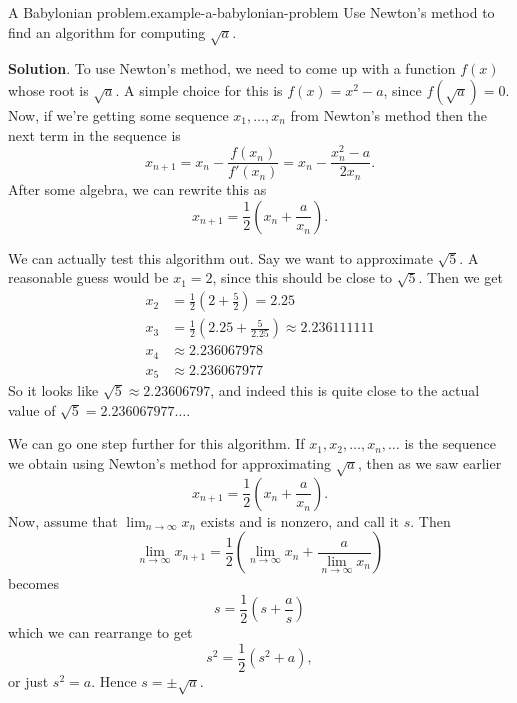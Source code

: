 \documentclass[10pt,]{book}
\numberwithin{equation}{section}
\begin{document}
\begin{example}{A Babylonian problem.}{example-a-babylonian-problem}%
\hypertarget{p-373}{}%
Use Newton's method to find an algorithm for computing \(\sqrt{a}\).%
\par\smallskip%
\noindent\textbf{Solution}.\hypertarget{solution-83}{}\quad%
\hypertarget{p-374}{}%
To use Newton's method, we need to come up with a function \(f(x)\) whose root is \(\sqrt{a}\). A simple choice for this is \(f(x) = x^{2} - a\), since \(f(\sqrt{a}) = 0\). Now, if we're getting some sequence \(x_{1},\ldots,x_{n}\) from Newton's method then the next term in the sequence is%
\begin{equation*}
x_{n+1} = x_{n} - \frac{f(x_{n})}{f'(x_{n})} = x_{n} - \frac{x_{n}^{2} - a}{2x_{n}}.
\end{equation*}
After some algebra, we can rewrite this as%
\begin{equation*}
x_{n+1} = \frac{1}{2}\left(x_{n} + \frac{a}{x_{n}}\right).
\end{equation*}
%
\par
\hypertarget{p-375}{}%
We can actually test this algorithm out. Say we want to approximate \(\sqrt{5}\). A reasonable guess would be \(x_{1} = 2\), since this should be close to \(\sqrt{5}\). Then we get%
\begin{align*}
x_{2} & = \frac{1}{2}\left(2 + \frac{5}{2}\right) = 2.25 \\
x_{3} & = \frac{1}{2}\left(2.25 + \frac{5}{2.25}\right) \approx 2.236111111 \\
x_{4} & \approx 2.236067978 \\
x_{5} & \approx 2.236067977 
\end{align*}
So it looks like \(\sqrt{5}\approx 2.23606797\), and indeed this is quite close to the actual value of \(\sqrt{5} = 2.236067977\ldots\).%
\par
\hypertarget{p-376}{}%
We can go one step further for this algorithm. If \(x_{1},x_{2},\ldots,x_{n},\ldots\) is the sequence we obtain using Newton's method for approximating \(\sqrt{a}\), then as we saw earlier%
\begin{equation*}
x_{n+1} = \frac{1}{2}\left(x_{n} + \frac{a}{x_{n}}\right).
\end{equation*}
Now, assume that \(\lim_{n\to\infty}x_{n}\) exists and is nonzero, and call it \(s\). Then%
\begin{equation*}
\lim_{n\to\infty}x_{n+1} = \frac{1}{2}\left(\lim_{n\to\infty}x_{n} + \frac{a}{\lim_{n\to\infty}x_{n}}\right)
\end{equation*}
becomes%
\begin{equation*}
s = \frac{1}{2}\left(s + \frac{a}{s}\right)
\end{equation*}
which we can rearrange to get%
\begin{equation*}
s^{2} = \frac{1}{2}(s^{2} + a),
\end{equation*}
or just \(s^{2} = a\). Hence \(s = \pm\sqrt{a}\).%
\end{example}
%
%
\typeout{************************************************}
\typeout{************************************************}
%
\end{document}
